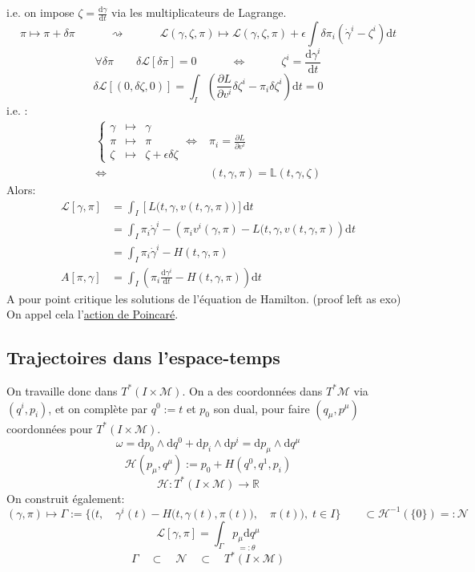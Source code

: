\documentclass[a4paper,11pt]{article}
\renewcommand{\d}{{\mathrm{d}}}
\newcommand{\dr}[2]{\frac{\partial {#1}}{\partial{#2}}}
\begin{document}
\color{red}i.e. on impose $\zeta = \frac{\d \gamma}{\d t}$ via les multiplicateurs de Lagrange.\color{black}
$$\pi \mapsto \pi + \delta \pi \quad \quad \quad \rightsquigarrow \quad\quad\quad
\mathcal{L}(\gamma,\zeta,\pi) \mapsto \mathcal{L}(\gamma,\zeta,\pi) + \epsilon \int \delta\pi_i (\dot\gamma^i - \zeta^i)\d t$$
$$\forall\delta\pi \quad \quad \delta\mathcal{L}[\delta\pi]=0 \quad \quad \quad \iff\quad \quad \quad \zeta^i = \frac{\d\gamma^i}{\d t}$$
$$\delta\mathcal{L}[(0,\delta\zeta,0)] = \int_I \left(\dr L{v^i}\delta\zeta^i-\pi_i\delta\zeta^i\right)\d t = 0$$
i.e. :
\begin{align*}
\left\{\begin{matrix}
\gamma & \mapsto & \gamma\\
\pi & \mapsto & \pi\\
\zeta & \mapsto & \zeta + \epsilon\delta\zeta
\end{matrix}\right.
\iff & \pi_i = \dr L{v^i}\\
\iff & (t,\gamma,\pi) = \mathbb{L}(t,\gamma, \zeta)
\end{align*}
Alors:
\begin{align*}
\mathcal{L}[\gamma,\pi] &= \int_I \left[L\big(t,\gamma,v(t,\gamma,\pi)\big)
\right] \d t\\
&= \int_I \pi_i \dot \gamma^i - \left(\pi_i v^i(\gamma,\pi) - L\big(t,\gamma,v(t,\gamma,\pi)\right)\d t\\
&= \int_I \pi_i\dot\gamma^i - H(t,\gamma,\pi)\\
A[\pi,\gamma] &= \int_I \left(\pi_i \frac{\d \gamma^i}{\d t}- H(t,\gamma,\pi)\right) \d t
\end{align*}
A pour point critique les solutions de l'équation de Hamilton. (proof left as exo)\\
On appel cela l'\underline{action de Poincaré}.

\subsection{Trajectoires dans l'espace-temps}
On travaille donc dans $T^*(I\times \mathcal{M})$. On a des coordonnées dans $T^*\mathcal{M}$ via $(q^i,p_i)$, et on complète par $q^0:=t$ et $p_0$ son dual, pour faire $(q_\mu,p^\mu)$ coordonnées pour $T^*(I\times \mathcal{M})$.
$$\omega = \d p_0 \wedge \d q^0 + \d p_i \wedge \d p^i = \d p_\mu \wedge \d q^\mu$$
$$\mathcal{H}(p_\mu, q^\mu):= p_0 + H(q^0,q^1,p_i)$$
$$\mathcal{H}: T^*(I\times\mathcal{M}) \to \mathbb{R}$$
On construit également:
$$(\gamma,\pi) \mapsto \Gamma:=\Bigg\{\bigg(t,\quad \gamma^i(t) - H\Big(t,\gamma(t),\pi(t)\Big),\quad\pi(t)\bigg),\; t\in I\Bigg\} \quad \quad \subset \mathcal{H}^{-1}(\{0\}) =: \mathcal{N}$$
$$\mathcal{L}[\gamma,\pi] = \int_\Gamma \underset{=:\theta}{p_\mu \d q^\mu}$$
$$\Gamma \quad \subset \quad \mathcal{N} \quad \subset \quad T^*(I\times\mathcal{M})$$
\end{document}
